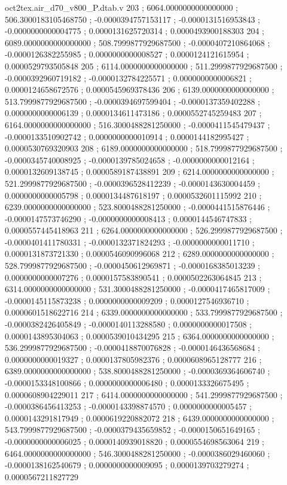 \begin{filecontents}[overwrite]{oct2tex.air_d70_v800_P.dtab.v}
203 ; 6064.0000000000000000 ; 506.3000183105468750 ; -0.0000394757153117 ; -0.0000131516953843 ; -0.0000000000004775 ; 0.0000131625720314 ; 0.0000493900188303
204 ; 6089.0000000000000000 ; 508.7999877929687500 ; -0.0000407210864068 ; -0.0000126382255985 ; 0.0000000000008527 ; 0.0000124121615954 ; 0.0000529793505848
205 ; 6114.0000000000000000 ; 511.2999877929687500 ; -0.0000392960719182 ; -0.0000132784225571 ; 0.0000000000006821 ; 0.0000124658672576 ; 0.0000545969378436
206 ; 6139.0000000000000000 ; 513.7999877929687500 ; -0.0000394697599404 ; -0.0000137359402288 ; 0.0000000000006139 ; 0.0000134611473186 ; 0.0000552745259483
207 ; 6164.0000000000000000 ; 516.3000488281250000 ; -0.0000411545479437 ; -0.0000133510902742 ; 0.0000000000010914 ; 0.0000144182995427 ; 0.0000530769320903
208 ; 6189.0000000000000000 ; 518.7999877929687500 ; -0.0000345740008925 ; -0.0000139785024658 ; -0.0000000000012164 ; 0.0000132609138745 ; 0.0000589187438891
209 ; 6214.0000000000000000 ; 521.2999877929687500 ; -0.0000396528412239 ; -0.0000143630004459 ; 0.0000000000005798 ; 0.0000134487618197 ; 0.0000532601115992
210 ; 6239.0000000000000000 ; 523.8000488281250000 ; -0.0000441515876446 ; -0.0000147573746290 ; -0.0000000000008413 ; 0.0000144546747833 ; 0.0000557445418963
211 ; 6264.0000000000000000 ; 526.2999877929687500 ; -0.0000401411780331 ; -0.0000132371824293 ; -0.0000000000011710 ; 0.0000131873721330 ; 0.0000546090996068
212 ; 6289.0000000000000000 ; 528.7999877929687500 ; -0.0000450612969871 ; -0.0000168385013239 ; 0.0000000000007276 ; 0.0000157583890541 ; 0.0000502263064845
213 ; 6314.0000000000000000 ; 531.3000488281250000 ; -0.0000417465817009 ; -0.0000145115873238 ; 0.0000000000009209 ; 0.0000127546936710 ; 0.0000601518622716
214 ; 6339.0000000000000000 ; 533.7999877929687500 ; -0.0000382426405849 ; -0.0000140113288580 ; 0.0000000000017508 ; 0.0000143895304063 ; 0.0000539010434295
215 ; 6364.0000000000000000 ; 536.2999877929687500 ; -0.0000418870076828 ; -0.0000146436568684 ; 0.0000000000019327 ; 0.0000137805982376 ; 0.0000608965128777
216 ; 6389.0000000000000000 ; 538.8000488281250000 ; -0.0000369364606740 ; -0.0000153348100866 ; 0.0000000000006480 ; 0.0000133326675495 ; 0.0000608904229011
217 ; 6414.0000000000000000 ; 541.2999877929687500 ; -0.0000386456413253 ; -0.0000143398874570 ; 0.0000000000005457 ; 0.0000143291817949 ; 0.0000619220882072
218 ; 6439.0000000000000000 ; 543.7999877929687500 ; -0.0000379435659852 ; -0.0000150651649165 ; -0.0000000000006025 ; 0.0000140939018820 ; 0.0000554698563064
219 ; 6464.0000000000000000 ; 546.3000488281250000 ; -0.0000386029460060 ; -0.0000138162540679 ; 0.0000000000009095 ; 0.0000139703279274 ; 0.0000567211827729

\end{filecontents}
